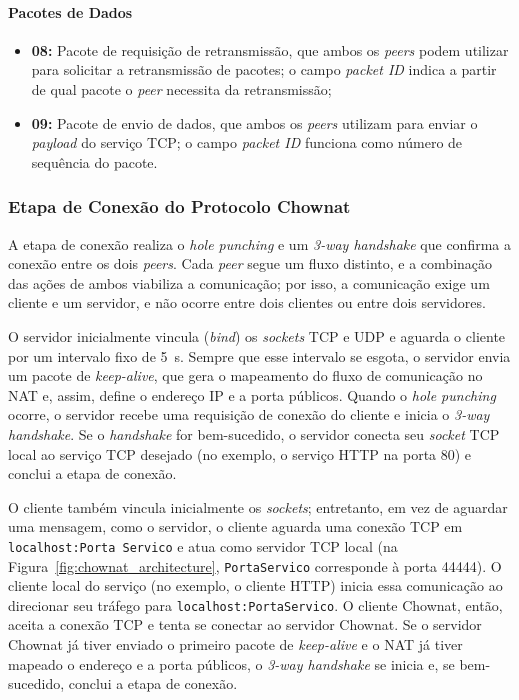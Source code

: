 \paragraph{Pacotes de Dados}

\begin{itemize}
    \item \textbf{08:} Pacote de requisição de retransmissão, que ambos os \textit{peers} podem utilizar para solicitar a retransmissão de pacotes; o campo \textit{packet ID} indica a partir de qual pacote o \textit{peer} necessita da retransmissão;
    \item \textbf{09:} Pacote de envio de dados, que ambos os \textit{peers} utilizam para enviar o \textit{payload} do serviço TCP; o campo \textit{packet ID} funciona como número de sequência do pacote.
\end{itemize}

\subsubsection{Etapa de Conexão do Protocolo Chownat}
\label{sec:chownat_connection}

A etapa de conexão realiza o \textit{hole punching} e um \textit{3-way handshake} que confirma a conexão entre os dois \textit{peers}. Cada \textit{peer} segue um fluxo distinto, e a combinação das ações de ambos viabiliza a comunicação; por isso, a comunicação exige um cliente e um servidor, e não ocorre entre dois clientes ou entre dois servidores.

O servidor inicialmente vincula (\textit{bind}) os \textit{sockets} TCP e UDP e aguarda o cliente por um intervalo fixo de 5~s. Sempre que esse intervalo se esgota, o servidor envia um pacote de \textit{keep-alive}, que gera o mapeamento do fluxo de comunicação no NAT e, assim, define o endereço IP e a porta públicos. Quando o \textit{hole punching} ocorre, o servidor recebe uma requisição de conexão do cliente e inicia o \textit{3-way handshake}. Se o \textit{handshake} for bem-sucedido, o servidor conecta seu \textit{socket} TCP local ao serviço TCP desejado (no exemplo, o serviço HTTP na porta 80) e conclui a etapa de conexão.

O cliente também vincula inicialmente os \textit{sockets}; entretanto, em vez de aguardar uma mensagem, como o servidor, o cliente aguarda uma conexão TCP em \texttt{localhost:Porta Servico} e atua como servidor TCP local (na Figura~\ref{fig:chownat_architecture}, \texttt{PortaServico} corresponde à porta 44444). O cliente local do serviço (no exemplo, o cliente HTTP) inicia essa comunicação ao direcionar seu tráfego para \texttt{localhost:PortaServico}. O cliente Chownat, então, aceita a conexão TCP e tenta se conectar ao servidor Chownat. Se o servidor Chownat já tiver enviado o primeiro pacote de \textit{keep-alive} e o NAT já tiver mapeado o endereço e a porta públicos, o \textit{3-way handshake} se inicia e, se bem-sucedido, conclui a etapa de conexão.

